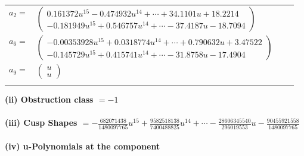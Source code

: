 \documentclass[1p]{elsarticle_modified}
\theoremstyle{definition}
\begin{document}
\begin{tabular}{m{7pt} m{180pt} m{7pt} m{180pt} }
\flushright $a_{2}=$&$\begin{pmatrix}0.161372 u^{15}-0.474932 u^{14}+\cdots+34.1101 u+18.2214\\-0.181949 u^{15}+0.546757 u^{14}+\cdots-37.4187 u-18.7094\end{pmatrix}$ \\
\flushright $a_{6}=$&$\begin{pmatrix}-0.00353928 u^{15}+0.0318774 u^{14}+\cdots+0.790632 u+3.47522\\-0.145729 u^{15}+0.415741 u^{14}+\cdots-31.8758 u-17.4904\end{pmatrix}$ \\
\flushright $a_{9}=$&$\begin{pmatrix}u\\u\end{pmatrix}$\\&\end{tabular}
\flushleft \textbf{(ii) Obstruction class $= -1$}\\~\\
\flushleft \textbf{(iii) Cusp Shapes $= -\frac{682071438}{1480097765} u^{15}+\frac{9582518138}{7400488825} u^{14}+\cdots-\frac{28606345540}{296019553} u-\frac{90455921558}{1480097765}$}\\~\\
\newpage\renewcommand{\arraystretch}{1}
\flushleft \textbf{(iv) u-Polynomials at the component}\newline \\
\end{document}
